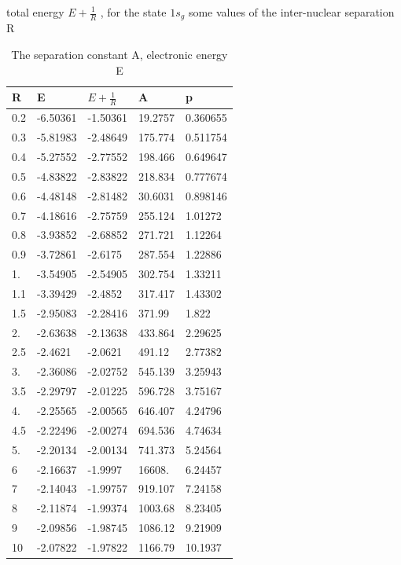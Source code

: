     \begin{table}[h!]
  \caption{ The separation constant A, electronic energy E}{total energy $ E + \frac{1}{R} $ , for the state $ 1s_g $ some values of the inter-nuclear separation R }
  \centering
  \label{1sg}
		\begin{tabular}{ m{6em} m{6em}  m{6em}  m{6em} m{6em} }
			\hline
			R & E & $ E + \frac{1}{R} $ & A & p \\ \hline \hline
 0.2 & -6.50361 & -1.50361 & 19.2757 & 0.360655\\
 0.3 & -5.81983 & -2.48649 & 175.774 & 0.511754\\
 0.4 & -5.27552 & -2.77552 & 198.466 & 0.649647\\
 0.5 & -4.83822 & -2.83822 & 218.834 & 0.777674\\
 0.6 & -4.48148 & -2.81482 & 30.6031 & 0.898146\\
 0.7 & -4.18616 & -2.75759 & 255.124 & 1.01272\\
 0.8 & -3.93852 & -2.68852 & 271.721 & 1.12264\\
 0.9 & -3.72861 & -2.6175 & 287.554 & 1.22886\\
 1. & -3.54905 & -2.54905 & 302.754 & 1.33211\\
 1.1 & -3.39429 & -2.4852 & 317.417 & 1.43302\\
 1.5 & -2.95083 & -2.28416 & 371.99 & 1.822\\
 2. & -2.63638 & -2.13638 & 433.864 & 2.29625\\
 2.5 & -2.4621 & -2.0621 & 491.12 & 2.77382\\
 3. & -2.36086 & -2.02752 & 545.139 & 3.25943\\
 3.5 & -2.29797 & -2.01225 & 596.728 & 3.75167\\
 4. & -2.25565 & -2.00565 & 646.407 & 4.24796\\
 4.5 & -2.22496 & -2.00274 & 694.536 & 4.74634\\
 5. & -2.20134 & -2.00134 & 741.373 & 5.24564\\
 6 & -2.16637 & -1.9997 & 16608. & 6.24457\\
 7 & -2.14043 & -1.99757 & 919.107 & 7.24158\\
 8 & -2.11874 & -1.99374 & 1003.68 & 8.23405\\
 9 & -2.09856 & -1.98745 & 1086.12 & 9.21909\\
 10 & -2.07822 & -1.97822 & 1166.79 & 10.1937 \\
          \hline
		\end{tabular}
    \end{table}

